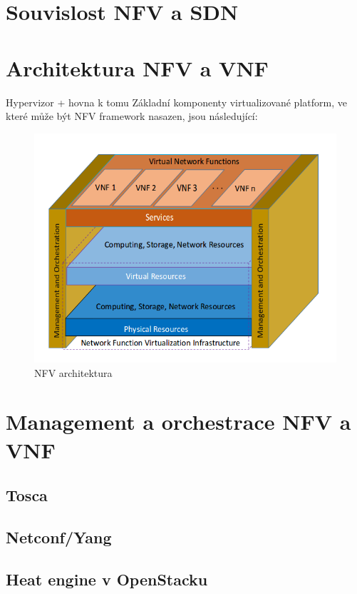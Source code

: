 \section{Souvislost NFV a SDN}\label{sub:interaction}


\section{Architektura NFV a VNF}\label{sub:interaction}

Hypervizor + hovna k tomu
Základní komponenty virtualizované platform, ve které může být NFV framework nasazen, jsou následující:


\begin{figure}[h]
\begin{centering}
\includegraphics[scale=0.5]{images/NFV_architektura}
\par\end{centering}
\caption{NFV architektura\label{fig:NFV_architektura}}
\end{figure}


\section{Management a orchestrace NFV a VNF}\label{sub:interaction}

	\subsection{Tosca}\label{sub:interaction}

	\subsection{Netconf/Yang}\label{sub:interaction}

	\subsection{Heat engine v OpenStacku}\label{sub:interaction}

\section{}





